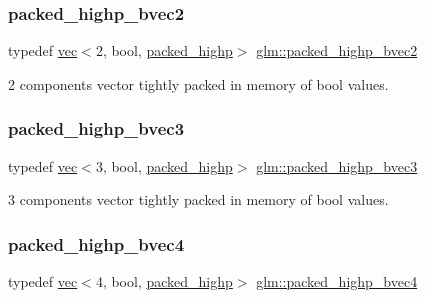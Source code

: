 \subsubsection{\texorpdfstring{packed\+\_\+highp\+\_\+bvec2}{packed\_highp\_bvec2}}
{\footnotesize\ttfamily typedef \hyperlink{structglm_1_1vec}{vec}$<$2, bool, \hyperlink{namespaceglm_a36ed105b07c7746804d7fdc7cc90ff25a8e8791ee77fe079b1291f710d88031bf}{packed\+\_\+highp}$>$ \hyperlink{group__gtc__type__aligned_ga8059c50785881a9f30b9a8e3ff5daf83}{glm\+::packed\+\_\+highp\+\_\+bvec2}}



2 components vector tightly packed in memory of bool values. 

\mbox{\label{group__gtc__type__aligned_gafad47eaff82deab03a1e8d82d2dbd046}} 
\subsubsection{\texorpdfstring{packed\+\_\+highp\+\_\+bvec3}{packed\_highp\_bvec3}}
{\footnotesize\ttfamily typedef \hyperlink{structglm_1_1vec}{vec}$<$3, bool, \hyperlink{namespaceglm_a36ed105b07c7746804d7fdc7cc90ff25a8e8791ee77fe079b1291f710d88031bf}{packed\+\_\+highp}$>$ \hyperlink{group__gtc__type__aligned_gafad47eaff82deab03a1e8d82d2dbd046}{glm\+::packed\+\_\+highp\+\_\+bvec3}}



3 components vector tightly packed in memory of bool values. 

\mbox{\label{group__gtc__type__aligned_gaa7a006e26052e668a16bf3b8bd81cbef}} 
\subsubsection{\texorpdfstring{packed\+\_\+highp\+\_\+bvec4}{packed\_highp\_bvec4}}
{\footnotesize\ttfamily typedef \hyperlink{structglm_1_1vec}{vec}$<$4, bool, \hyperlink{namespaceglm_a36ed105b07c7746804d7fdc7cc90ff25a8e8791ee77fe079b1291f710d88031bf}{packed\+\_\+highp}$>$ \hyperlink{group__gtc__type__aligned_gaa7a006e26052e668a16bf3b8bd81cbef}{glm\+::packed\+\_\+highp\+\_\+bvec4}}



